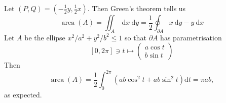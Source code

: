 \begin{example}
    Let $(P, Q)=\left(-\frac{1}{2} y, \frac{1}{2} x\right) .$ Then Green's theorem tells us
    \[
    \operatorname{area}(A)=\iint_{A} \mathrm{~d} x \mathrm{~d} y=\frac{1}{2} \oint_{\partial A} x \mathrm{~d} y-y \mathrm{~d} x
    \]
    Let $A$ be the ellipse $x^{2} / a^{2}+y^{2} / b^{2} \leq 1$ so that $\partial A$ has parametrisation
    \[
    [0,2 \pi] \ni t \mapsto \begin{pmatrix}
        a \cos t \\
        b \sin t
    \end{pmatrix}
    \]
    Then
    \[
    \operatorname{area}(A)=\frac{1}{2} \int_{0}^{2 \pi}\left(a b \cos ^{2} t+a b \sin ^{2} t\right) \mathrm{d} t=\pi a b,
    \]
    as expected.
\end{example}